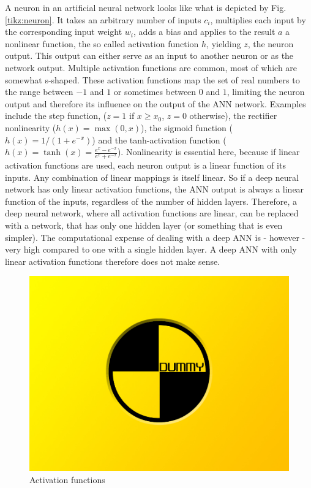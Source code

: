 A neuron in an artificial neural network looks like what is depicted by Fig. \ref{tikz:neuron}. It takes an arbitrary number of inputs $c_i$, multiplies each input by the corresponding input weight $w_i$, adds a bias and applies to the result $a$ a nonlinear function, the so called activation function $h$, yielding $z$, the neuron output. This output can either serve as an input to another neuron or as the network output. Multiple activation functions are common, most of which are somewhat s-shaped. These activation functions map the set of real numbers to the range between $-1$ and $1$ or sometimes between $0$ and $1$, limiting the neuron output and therefore its influence on the output of the ANN network. Examples include the step function, ($z=1$ if $x \geq x_0$, $z=0$ otherwise), the rectifier nonlinearity ($h(x)=\max(0,x)$), the sigmoid function ($h(x)=1/(1+e^{-x})$) and the tanh-activation function ($h(x)=\tanh(x)=\frac{e^x-e^{-x}}{e^x+e^{-x}}$).
Nonlinearity is essential here, because if linear activation functions are used, each neuron output is a linear function of its inputs. Any combination of linear mappings is itself linear. So if a deep neural network has only linear activation functions, the ANN output is always a linear function of the inputs, regardless of the number of hidden layers. Therefore, a deep neural network, where all activation functions are linear, can be replaced with a network, that has only one hidden layer (or something that is even simpler). The computational expense of dealing with a deep ANN is - however - very high compared to one with a single hidden layer. A deep ANN with only linear activation functions therefore does not make sense.

\begin{figure}[h]
	\includegraphics[width=\textwidth]{src/pics/dummy.jpg}
	\caption{Activation functions \cite{Zuern2017}}
	\label{fig:activation_functions} 
\end{figure}


